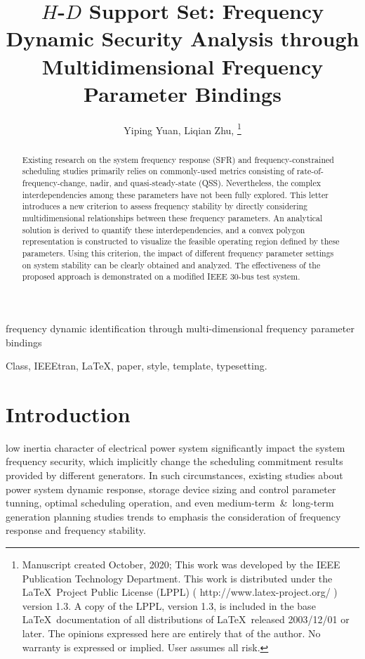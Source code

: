 \documentclass[lettersize,journal]{IEEEtran}
\begin{document}
\title{$H$-$D$ Support Set: Frequency Dynamic Security Analysis through Multidimensional Frequency Parameter Bindings}
\author{Yiping Yuan, Liqian Zhu,
\thanks{Manuscript created October, 2020; This work was developed by the IEEE Publication Technology Department. This work is distributed under the \LaTeX \ Project Public License (LPPL) ( http://www.latex-project.org/ ) version 1.3. A copy of the LPPL, version 1.3, is included in the base \LaTeX \ documentation of all distributions of \LaTeX \ released 2003/12/01 or later. The opinions expressed here are entirely that of the author. No warranty is expressed or implied. User assumes all risk.}}

%
{frequency dynamic identification through multi-dimensional frequency parameter bindings}

\maketitle

\begin{abstract}

  Existing research on the system frequency response (SFR) and frequency-constrained scheduling studies primarily relies on commonly-used metrics consisting of rate-of-frequency-change, nadir, and quasi-steady-state (QSS). Nevertheless, the complex interdependencies among these parameters have not been fully explored. This letter introduces a new criterion to assess frequency stability by directly considering multidimensional relationships between these frequency parameters. An analytical solution is derived to quantify these interdependencies, and a convex polygon representation is constructed to visualize the feasible operating region defined by these parameters. Using this criterion, the impact of different frequency parameter settings on system stability can be clearly obtained and analyzed. The effectiveness of the proposed approach is demonstrated on a modified IEEE 30-bus test system.

\end{abstract}

\begin{IEEEkeywords}
Class, IEEEtran, \LaTeX, paper, style, template, typesetting.
\end{IEEEkeywords}

\section{Introduction}
 low inertia character of electrical power system significantly impact the system frequency security, which implicitly change the scheduling commitment results provided by different generators. In such circumstances, existing studies about power system dynamic response, storage device sizing and control parameter tunning, optimal scheduling operation, and even medium-term~\&~long-term generation planning studies trends to emphasis the consideration of frequency response and frequency stability.
\end{document}
